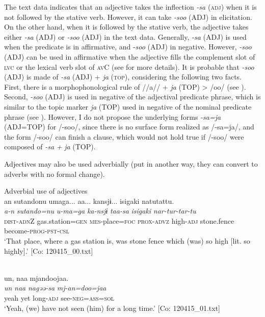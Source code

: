 The text data indicates that an adjective takes the inflection \textit{{}-sa} (\textsc{adj}) when it is not followed by the stative verb. However, it can take \textit{{}-soo} (ADJ) in elicitation. On the other hand, when it is followed by the stative verb, the adjective takes either \textit{{}-sa} (ADJ) or \textit{{}-soo} (ADJ) in the text data. Generally, \textit{{}-sa} (ADJ) is used when the predicate is in affirmative, and -\textit{soo} (ADJ) in negative. However, \textit{{}-soo} (ADJ) can be used in affirmative when the adjective fills the complement slot of \textsc{lvc} or the lexical verb slot of \textsc{av}C (see  for more details). It is probable that \textit{{}-soo} (ADJ) is made of \textit{{}-sa} (ADJ) + \textit{ja} (\textsc{top}), considering the following two facts. First, there is a morphophonological rule of //a// + \textit{ja} (TOP) > /oo/ (see ). Second, \textit{{}-soo} (ADJ) is used in negative of the adjectival predicate phrase, which is similar to the topic marker \textit{ja} (TOP) used in negative of the nominal predicate phrase (see ). However, I do not propose the underlying forms \textit{{}-sa=ja} (ADJ=TOP) for /-soo/, since there is no surface form realized as /-sa=ja/, and the form /-soo/ can finish a clause, which would not hold true if /-soo/ were composed of \textit{{}-sa} \textit{+} \textit{ja} (TOP).

Adjectives may also be used adverbially (put in another way, they can convert to adverbs with no formal change).

\ea  Adverbial use of adjectives \label{ex:4.51}
\ea{}\\
\glll    an  {\textbar}sutando{\textbar}nu  umaga...  aa...  kansjɨ...    isigaki  natutattu.\\
      \textit{a-n}  \textit{sutando=nu}  \textit{u-ma=ga}    \textit{ka-nsjɨ}  \textit{taa-sa}  \textit{isigaki}  \textit{nar-tur-tar-tu}\\
      \textsc{dist}-\textsc{adn}Z  gas.station=\textsc{gen}  \textsc{mes}-place=\textsc{foc}    \textsc{prox}-\textsc{advz}    high-\textsc{adj}  stone.fence  become-\textsc{prog}-\textsc{pst}-\textsc{csl}\\
      \glt       ‘That place, where a gas station is, was stone fence which (was) so high [lit. so highly].’ [Co: 120415\_00.txt]

\ex{}\\
\glll     {\textbar}un{\textbar},  naa    mjandoojaa.\\
      \textit{un}  \textit{naa}  \textit{nagəə-sa}  \textit{mj-an=doo=jaa}\\
      yeah  yet  long-\textsc{adj}  see-\textsc{neg}=\textsc{ass}=\textsc{sol}\\
      \glt       ‘Yeah, (we) have not seen (him) for a long time.’ [Co: 120415\_01.txt]

